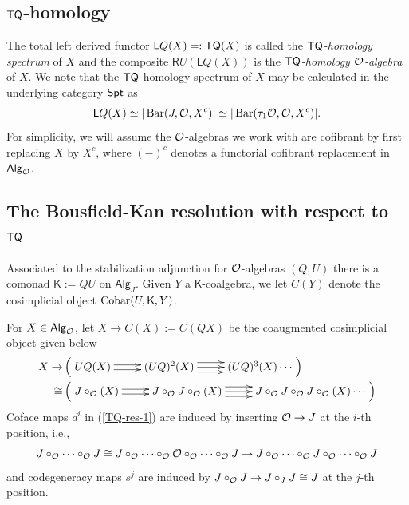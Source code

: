\subsection{$\mathsf{TQ}$-homology}
The total left derived functor $\mathsf{L}Q(X)=:\mathsf{TQ}(X)$ is called the \textit{$\mathsf{TQ}$-homology spectrum} of $X$ and the composite $\mathsf{R}U(\mathsf{L}Q(X))$ is the \textit{$\mathsf{TQ}$-homology $\mathcal{O}$-algebra} of $X$. We note that the $\mathsf{TQ}$-homology spectrum of $X$ may be calculated in the underlying category $\mathsf{Spt}$ as \begin{equation*}
    \mathsf{L}Q(X)\simeq |\operatorname{Bar}(J,\mathcal{O}, X^c)|\simeq |\operatorname{Bar}(\tau_1\mathcal{O}, \mathcal{O}, X^c)|.
\end{equation*}
For simplicity, we will assume the $\mathcal{O}$-algebras we work with are cofibrant by first replacing $X$ by $X^c$, where $(-)^c$ denotes a functorial cofibrant replacement in ${\mathsf{Alg}_{\mathcal{O}}}$.

\subsection{The Bousfield-Kan resolution with respect to $\mathsf{TQ}$} \label{sec:TQ-completion}
Associated to the stabilization adjunction for $\mathcal{O}$-algebras $(Q,U)$ there is a comonad $\mathsf{K}:=QU$ on $\mathsf{Alg}_J$. Given $Y$ a $\mathsf{K}$-coalgebra, we let $C(Y)$ denote the cosimplicial object $\operatorname{Cobar}(U, \mathsf{K}, Y)$.  

For $X\in {\mathsf{Alg}_{\mathcal{O}}}$, let $X\to C(X):= C(QX)$ be the coaugmented cosimplicial object given below \begin{align}
\label{TQ-res-1}
    X \to &\left( \xymatrix{
    UQ(X) \ar@<.5 ex>[r] \ar@<-.5ex>[r] &
    (UQ)^2 (X) \ar@<1 ex>[r] \ar[r] \ar@<-1 ex>[r] &
    (UQ)^3(X) \cdots
    }\right)\\
    \cong &\left(\xymatrix{ J\circ_{\Cal{O}}(X) \ar@<.5 ex>[r] \ar@<-.5ex>[r] &
    J\circ_{\Cal{O}}J\circ_{\Cal{O}}(X) \ar@<1 ex>[r] \ar[r] \ar@<-1 ex>[r] &
    J\circ_{\Cal{O}}J\circ_{\Cal{O}}J\circ_{\Cal{O}}(X) \cdots }\right) \nonumber
\end{align} 
Coface maps $d^i$ in (\ref{TQ-res-1}) are induced by inserting $\mathcal{O}\to J$ at the $i$-th position, i.e., \[  J \circ_{\mathcal{O}} \cdots \circ_{\mathcal{O}} J \cong J \circ_{\mathcal{O}} \cdots \circ_{\mathcal{O}} \mathcal{O} \circ_{\mathcal{O}} \cdots \circ_{\mathcal{O}} J \to J \circ_{\mathcal{O}} \cdots \circ_{\mathcal{O}} J \circ_{\mathcal{O}} \cdots \circ_{\mathcal{O}} J\] and codegeneracy maps $s^j$ are induced by $J\circ_{\mathcal{O}} J\to J\circ_J J\cong J$ at the $j$-th position. 

